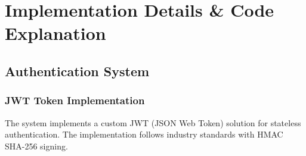 \documentclass[12pt,a4paper]{article}
\begin{document}
\section{Implementation Details \& Code Explanation}

\subsection{Authentication System}

\subsubsection{JWT Token Implementation}

The system implements a custom JWT (JSON Web Token) solution for stateless authentication. The implementation follows industry standards with HMAC SHA-256 signing.
\end{document}
